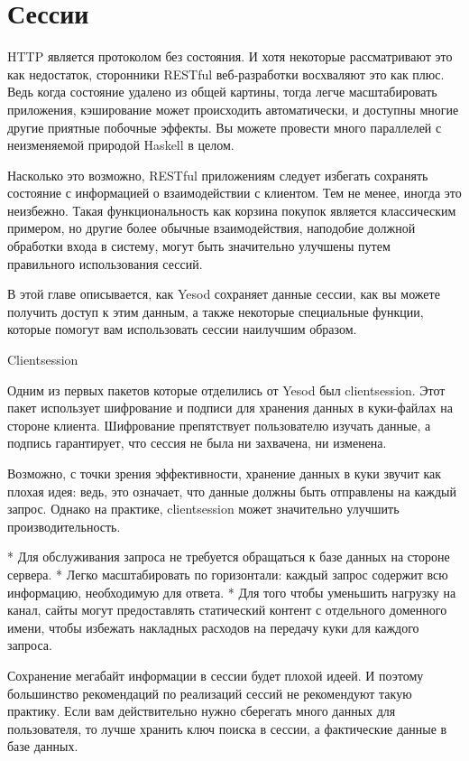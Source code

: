 \chapter{Сессии}\label{ch:sessions}

HTTP является протоколом без состояния. И хотя некоторые рассматривают это как недостаток, сторонники RESTful веб-разработки восхваляют это как плюс. Ведь когда состояние удалено из общей картины, тогда легче масштабировать приложения, кэширование может происходить автоматически, и доступны многие другие приятные побочные эффекты. Вы можете провести много параллелей с неизменяемой природой Haskell в целом.

Насколько это возможно, RESTful приложениям следует избегать сохранять состояние с информацией о взаимодействии с клиентом. Тем не менее, иногда это неизбежно. Такая функциональность как корзина покупок является классическим примером, но другие более обычные взаимодействия, наподобие должной обработки входа в систему, могут быть значительно улучшены путем правильного использования сессий.

В этой главе описывается, как Yesod сохраняет данные сессии, как вы можете получить доступ к этим данным, а также некоторые специальные функции, которые помогут вам использовать сессии наилучшим образом.

Clientsession

Одним из первых пакетов которые отделились от Yesod был clientsession. Этот пакет использует шифрование и подписи для хранения данных в куки-файлах на стороне клиента. Шифрование препятствует пользователю изучать данные, а подпись гарантирует, что сессия не была ни захвачена, ни изменена.

Возможно, с точки зрения эффективности, хранение данных в куки звучит как плохая идея: ведь, это означает, что данные должны быть отправлены на каждый запрос. Однако на практике, clientsession может значительно улучшить производительность.

* Для обслуживания запроса не требуется обращаться к базе данных на стороне сервера.
* Легко масштабировать по горизонтали: каждый запрос содержит всю информацию, необходимую для ответа.
* Для того чтобы уменьшить нагрузку на канал, сайты могут предоставлять статический контент с отдельного доменного имени, чтобы избежать накладных расходов на передачу куки для каждого запроса.

Сохранение мегабайт информации в сессии будет плохой идеей. И поэтому большинство рекомендаций по реализаций сессий не рекомендуют такую практику. Если вам действительно нужно сберегать много данных для пользователя, то лучше хранить ключ поиска в сессии, а фактические данные в базе данных.

